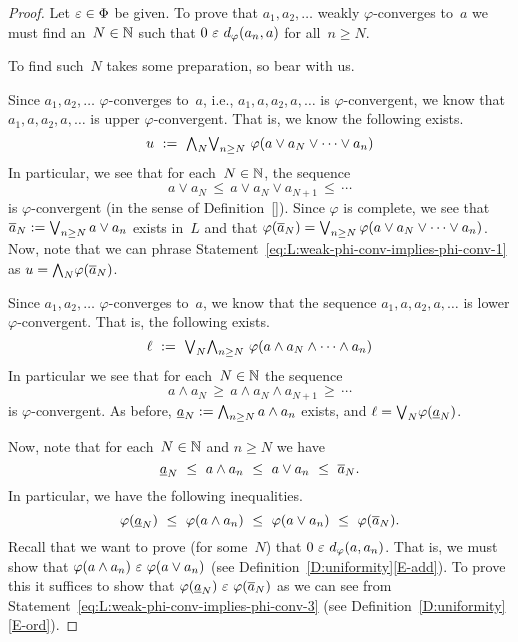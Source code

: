 \documentclass[main.tex]{subfiles}
\begin{document}
\begin{proof}
Let $\varepsilon \in \Phi$ be given.
To prove that $a_1,a_2,\dotsc$ weakly $\varphi$-converges to~$a$
we must find an~$N\in \mathbb{N}$ such that
$0 \ \varepsilon\ d_{\smash{\varphi}}(a_n,a)$ for all~$n\geq N$.

To find such~$N$ takes some preparation,
so bear with us.

Since $a_1,a_2,\dotsc$  $\varphi$-converges to~$a$,
i.e., $a_1,a,a_2,a,\dotsc$ is $\varphi$-convergent,
we know that $a_1,a,a_2,a,\dotsc$ is upper $\varphi$-convergent.
That is, we know the following exists.
\begin{equation}
\label{eq:L:weak-phi-conv-implies-phi-conv-1}
u\ \eqdf \ 
\bw_N \bv_{n\geq N}\  \varphi(a\vee a_N\vee \dotsb \vee a_n)
\end{equation}
In particular,
we see that for each~$N\in \mathbb{N}$,
the sequence 
\begin{equation*}
a\vee a_N \,\leq\, a\vee a_N\vee a_{N+1}\,\leq\,\dotsb
\end{equation*}
is $\varphi$-convergent
(in the sense of Definition~\ref{}).
Since $\varphi$ is complete,
we see that $\overline{a}_N := \textstyle{\bigvee}_{n\geq N} \, a \vee a_n$ exists in~$L$
and that $\varphi(\overline{a}_N) 
= \textstyle{\bigvee}_{n \geq N} \,\varphi(a \vee a_N \vee\dotsb \vee a_n)$.
Now, note that we
 can phrase Statement~\eqref{eq:L:weak-phi-conv-implies-phi-conv-1}
as $u = \textstyle{\bigwedge}_N \varphi(\overline{a}_N)$.

Since $a_1,a_2,\dotsc$ $\varphi$-converges to~$a$,
we know that the sequence $a_1,a,a_2,a,\dotsc$ is
lower $\varphi$-convergent. That is, the following exists.
\begin{equation}
\label{eq:L:weak-phi-conv-implies-phi-conv-2}
\ell\ \eqdf \ 
\bv_N \bw_{n\geq N}\  \varphi(a\wedge a_N\wedge \dotsb \wedge a_n)
\end{equation}
In particular we see that for each~$N\in\mathbb{N}$ the sequence
\begin{equation*}
a\wedge a_N \,\geq\, a\wedge a_N\wedge a_{N+1}\,\geq\,\dotsb
\end{equation*}
is $\varphi$-convergent.
As before, $\underline{a}_N := \textstyle{\bigwedge}_{n\geq N}\, a\wedge a_n$ exists,
and $\ell = \textstyle{\bigvee}_N \varphi(\underline{a}_N)$.

Now, note that for each~$N\in \mathbb{N}$ and $n\geq N$ we have
\begin{equation*}
\ul{a}_N \ \leq\ a\wedge a_n  \ \leq\ a\vee a_n  \ \leq\ \ol{a}_N.
\end{equation*}
In particular, we have the following inequalities.
\begin{equation}
\label{eq:L:weak-phi-conv-implies-phi-conv-3}
\varphi(\underline{a}_N) \ \leq\ \varphi(a\wedge a_n)  
\ \leq\ \varphi(a\vee a_n)  \ \leq\ \varphi(\overline{a}_N).
\end{equation}
Recall that we want to prove (for some~$N$) that
$0 \ \varepsilon\ d_{\smash{\varphi}}(a,a_n)$.
That is, we must show that $\varphi(a\wedge a_n) \ \ve\ \varphi(a\vee a_n)$
(see Definition~\ref{D:uniformity}\ref{E-add}).
To prove this it suffices to show 
that $\varphi(\underline{a}_N) \ \varepsilon\ \varphi(\overline{a}_N)$
as we can see from Statement~\eqref{eq:L:weak-phi-conv-implies-phi-conv-3}
(see  Definition~\ref{D:uniformity}\ref{E-ord}).


\end{proof}
\end{document}
